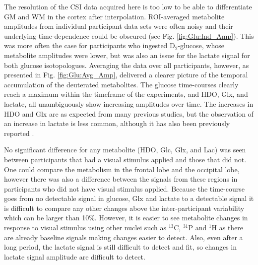 
The resolution of the \ac{CSI} data acquired here is too low to be able to differentiate \ac{GM} and \ac{WM} in the cortex after interpolation. \ac{ROI}-averaged metabolite amplitudes from individual participant data sets were often noisy and their underlying time-dependence could be obscured (see Fig. \ref{fig:Glu:Ind_Amp}). This was more often the case for participants who ingested D$_2$-glucose, whose metabolite amplitudes were lower, but was also an issue for the lactate signal for both glucose isotopologues. Averaging the data over all participants, however, as presented in Fig. \ref{fig:Glu:Avg_Amp}, delivered a clearer picture of the temporal accumulation of the deuterated metabolites. The glucose time-courses clearly reach a maximum within the timeframe of the experiments, and \ac{HDO}, Glx, and lactate, all unambiguously show increasing amplitudes over time. The increases in \ac{HDO} and Glx are as expected from many previous studies, but the observation of an increase in lactate is less common, although it has also been previously reported \cite{Ruhm2021DeuteriumResolution, Kaggie2022DeuteriumMetabolism}. 


No significant difference for any metabolite (\ac{HDO}, Glc, Glx, and Lac) was seen between participants that had a visual stimulus applied and those that did not. One could compare the metabolism in the frontal lobe and the occipital lobe, however there was also a difference between the signals from these regions in participants who did not have visual stimulus applied. Because the time-course goes from no detectable signal in glucose, Glx and lactate to a detectable signal it is difficult to compare any other changes above the inter-participant variability which can be larger than 10\%. However, it is easier to see metabolite changes in response to visual stimulus using other nuclei such as $^{13}$C, $^{31}$P and $^1$H as there are already baseline signals making changes easier to detect. Also, even after a long period, the lactate signal is still difficult to detect and fit, so changes in lactate signal amplitude are difficult to detect.  

